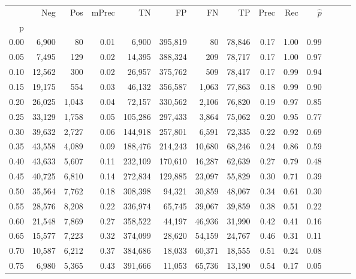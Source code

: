 \begin{tabular}{rrrrrrrrrrrrrr}
\toprule
{} &     Neg &    Pos & mPrec &       TN &       FP &      FN &      TP &  Prec &   Rec & $\hat{p}$ \\
p    &         &        &       &          &          &         &         &       &       &           \\
\midrule
0.00 &   6,900 &     80 &  0.01 &    6,900 &  395,819 &      80 &  78,846 &  0.17 &  1.00 &      0.99 \\
0.05 &   7,495 &    129 &  0.02 &   14,395 &  388,324 &     209 &  78,717 &  0.17 &  1.00 &      0.97 \\
0.10 &  12,562 &    300 &  0.02 &   26,957 &  375,762 &     509 &  78,417 &  0.17 &  0.99 &      0.94 \\
0.15 &  19,175 &    554 &  0.03 &   46,132 &  356,587 &   1,063 &  77,863 &  0.18 &  0.99 &      0.90 \\
0.20 &  26,025 &  1,043 &  0.04 &   72,157 &  330,562 &   2,106 &  76,820 &  0.19 &  0.97 &      0.85 \\
0.25 &  33,129 &  1,758 &  0.05 &  105,286 &  297,433 &   3,864 &  75,062 &  0.20 &  0.95 &      0.77 \\
0.30 &  39,632 &  2,727 &  0.06 &  144,918 &  257,801 &   6,591 &  72,335 &  0.22 &  0.92 &      0.69 \\
0.35 &  43,558 &  4,089 &  0.09 &  188,476 &  214,243 &  10,680 &  68,246 &  0.24 &  0.86 &      0.59 \\
0.40 &  43,633 &  5,607 &  0.11 &  232,109 &  170,610 &  16,287 &  62,639 &  0.27 &  0.79 &      0.48 \\
0.45 &  40,725 &  6,810 &  0.14 &  272,834 &  129,885 &  23,097 &  55,829 &  0.30 &  0.71 &      0.39 \\
0.50 &  35,564 &  7,762 &  0.18 &  308,398 &   94,321 &  30,859 &  48,067 &  0.34 &  0.61 &      0.30 \\
0.55 &  28,576 &  8,208 &  0.22 &  336,974 &   65,745 &  39,067 &  39,859 &  0.38 &  0.51 &      0.22 \\
0.60 &  21,548 &  7,869 &  0.27 &  358,522 &   44,197 &  46,936 &  31,990 &  0.42 &  0.41 &      0.16 \\
0.65 &  15,577 &  7,223 &  0.32 &  374,099 &   28,620 &  54,159 &  24,767 &  0.46 &  0.31 &      0.11 \\
0.70 &  10,587 &  6,212 &  0.37 &  384,686 &   18,033 &  60,371 &  18,555 &  0.51 &  0.24 &      0.08 \\
0.75 &   6,980 &  5,365 &  0.43 &  391,666 &   11,053 &  65,736 &  13,190 &  0.54 &  0.17 &      0.05 \\

\end{tabular}
